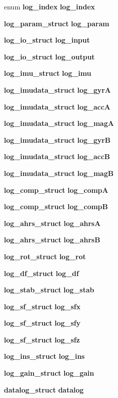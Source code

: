 \begin{DoxyCompactItemize}
\item 
enum \textbf{ log\+\_\+index} \textbf{ log\+\_\+index}
\item 
\textbf{ log\+\_\+param\+\_\+struct} \textbf{ log\+\_\+param}
\item 
\textbf{ log\+\_\+io\+\_\+struct} \textbf{ log\+\_\+input}
\item 
\textbf{ log\+\_\+io\+\_\+struct} \textbf{ log\+\_\+output}
\item 
\textbf{ log\+\_\+imu\+\_\+struct} \textbf{ log\+\_\+imu}
\item 
\textbf{ log\+\_\+imudata\+\_\+struct} \textbf{ log\+\_\+gyrA}
\item 
\textbf{ log\+\_\+imudata\+\_\+struct} \textbf{ log\+\_\+accA}
\item 
\textbf{ log\+\_\+imudata\+\_\+struct} \textbf{ log\+\_\+magA}
\item 
\textbf{ log\+\_\+imudata\+\_\+struct} \textbf{ log\+\_\+gyrB}
\item 
\textbf{ log\+\_\+imudata\+\_\+struct} \textbf{ log\+\_\+accB}
\item 
\textbf{ log\+\_\+imudata\+\_\+struct} \textbf{ log\+\_\+magB}
\item 
\textbf{ log\+\_\+comp\+\_\+struct} \textbf{ log\+\_\+compA}
\item 
\textbf{ log\+\_\+comp\+\_\+struct} \textbf{ log\+\_\+compB}
\item 
\textbf{ log\+\_\+ahrs\+\_\+struct} \textbf{ log\+\_\+ahrsA}
\item 
\textbf{ log\+\_\+ahrs\+\_\+struct} \textbf{ log\+\_\+ahrsB}
\item 
\textbf{ log\+\_\+rot\+\_\+struct} \textbf{ log\+\_\+rot}
\item 
\textbf{ log\+\_\+df\+\_\+struct} \textbf{ log\+\_\+df}
\item 
\textbf{ log\+\_\+stab\+\_\+struct} \textbf{ log\+\_\+stab}
\item 
\textbf{ log\+\_\+sf\+\_\+struct} \textbf{ log\+\_\+sfx}
\item 
\textbf{ log\+\_\+sf\+\_\+struct} \textbf{ log\+\_\+sfy}
\item 
\textbf{ log\+\_\+sf\+\_\+struct} \textbf{ log\+\_\+sfz}
\item 
\textbf{ log\+\_\+ins\+\_\+struct} \textbf{ log\+\_\+ins}
\item 
\textbf{ log\+\_\+gain\+\_\+struct} \textbf{ log\+\_\+gain}
\item 
\textbf{ datalog\+\_\+struct} \textbf{ datalog}
\end{DoxyCompactItemize}



